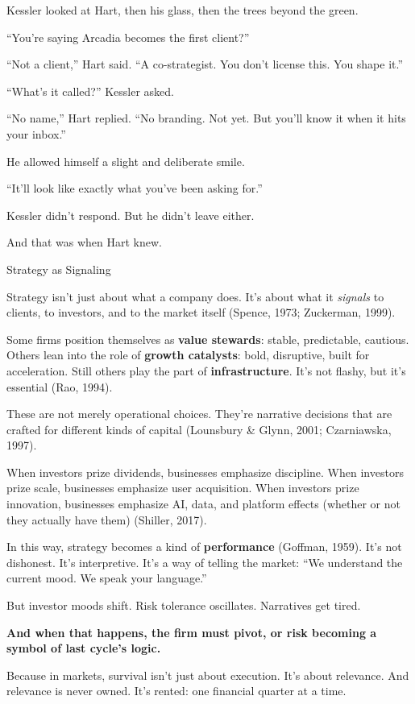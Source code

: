 Kessler looked at Hart, then his glass, then the trees beyond the green. 

“You’re saying Arcadia becomes the first client?”

“Not a client,” Hart said. “A co-strategist. You don’t license this. You shape it.”

“What’s it called?” Kessler asked.

“No name,” Hart replied. “No branding. Not yet. But you’ll know it when it hits your inbox.”

He allowed himself a slight and deliberate smile.

“It’ll look like exactly what you’ve been asking for.”

Kessler didn’t respond. But he didn’t leave either.

And that was when Hart knew.

\medskip

\begin{PhilosophicalSidebar}{Strategy as Signaling}

  Strategy isn’t just about what a company does.  
  It’s about what it \textit{signals} to clients, to investors, and to the market itself
  (Spence, 1973; Zuckerman, 1999).

  \medskip

  Some firms position themselves as \textbf{value stewards}: stable, predictable, cautious.  
  Others lean into the role of \textbf{growth catalysts}: bold, disruptive, built for acceleration.  
  Still others play the part of \textbf{infrastructure}. It's not flashy, but it's essential
  (Rao, 1994).

  \medskip

  These are not merely operational choices.  
  They’re narrative decisions that are crafted for different kinds of capital
  (Lounsbury \& Glynn, 2001; Czarniawska, 1997).

  \medskip

  When investors prize dividends, businesses emphasize discipline.  
  When investors prize scale, businesses emphasize user acquisition.  
  When investors prize innovation, businesses emphasize AI, data, and platform effects  
  (whether or not they actually have them) (Shiller, 2017).

  \medskip

  In this way, strategy becomes a kind of \textbf{performance} (Goffman, 1959).  
  It's not dishonest. It's interpretive.  
  It's a way of telling the market: ``We understand the current mood. We speak your language.''

  \medskip

  But investor moods shift.  
  Risk tolerance oscillates.  
  Narratives get tired.

  \medskip

  \textbf{And when that happens, the firm must pivot, or risk becoming a symbol of last cycle’s logic.}

  \medskip

  Because in markets, survival isn’t just about execution.  
  It’s about relevance.  
  And relevance is never owned.  
  It’s rented: one financial quarter at a time.

\end{PhilosophicalSidebar}


